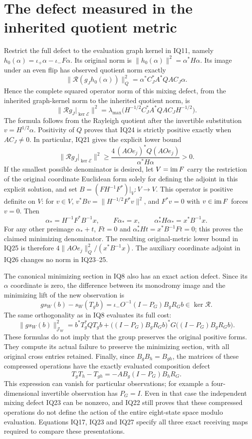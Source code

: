 \section{The defect measured in the inherited quotient metric}
Restrict the full defect to the evaluation graph kernel in IQ11, namely
$h_0(\alpha)=\iota_+\alpha-\iota_-F\alpha$.  Its original norm is
$\|h_0(\alpha)\|^2=\alpha^*H\alpha$.  Its image under an even flip
has observed quotient norm exactly
\[
 \|\mathcal R(g_Jh_0(\alpha))\|_Q^2
   =\alpha^*C_J^*A^*QA C_J\alpha.                  \tag{IQ23}
\]
Hence the complete squared operator norm of this mixing defect, from
the inherited graph-kernel norm to the inherited quotient norm, is
\[
 \|\mathcal Rg_J|_{\ker\mathcal E}\|^2
 =\lambda_{\max}
   \bigl(H^{-1/2}C_J^*A^*QA C_JH^{-1/2}\bigr).       \tag{IQ24}
\]
The formula follows from the Rayleigh quotient after the invertible
substitution $v=H^{1/2}\alpha$.  Positivity of $Q$ proves that IQ24
is strictly positive exactly when $AC_J\ne0$.  In particular, IQ21
gives the explicit lower bound
\[
 \|\mathcal Rg_J|_{\ker\mathcal E}\|^2
 \ge \frac{4\,(AOe_j)^*Q(AOe_j)}{\alpha^*H\alpha}>0. \tag{IQ25}
\]
If the smallest possible denominator is desired, let
$V=\operatorname{im} F$ carry the restriction of the original coordinate Euclidean
form solely for defining the adjoint in this explicit solution, and set
$B=(FH^{-1}F^*)|_V:V\to V$.  This operator is positive definite on
$V$: for $v\in V$, $v^*Bv=\|H^{-1/2}F^*v\|^2$, and
$F^*v=0$ with $v\in\operatorname{im} F$ forces $v=0$.  Then
\[
 \alpha_*=H^{-1}F^*B^{-1}x,\qquad
 F\alpha_*=x,\qquad
 \alpha_*^*H\alpha_*=x^*B^{-1}x.                   \tag{IQ26}
\]
For any other preimage $\alpha_*+t$, $Ft=0$ and
$\alpha_*^*Ht=x^*B^{-1}Ft=0$; this proves the claimed minimizing
denominator.  The resulting original-metric lower bound in IQ25 is
therefore $4\|AOe_j\|_Q^2/(x^*B^{-1}x)$.  The auxiliary coordinate
adjoint in IQ26 changes no norm in IQ23--25.

The canonical minimizing section in IQ8 also has an exact action defect.
Since its $\alpha$ coordinate is zero, the difference between its
monodromy image and the minimizing lift of the new observation is
\[
 g s_W(b)-s_W(T_gb)
 =\iota_-O^{-1}(I-P_G)B_gR_Gb\in\ker\mathcal R.     \tag{IQ27}
\]
The same orthogonality as in IQ8 evaluates its full cost:
\[
 \|g s_W(b)\|_{\mathcal J_W}^2
 =b^*T_g^*QT_gb+
  \bigl((I-P_G)B_gR_Gb\bigr)^*G
       \bigl((I-P_G)B_gR_Gb\bigr).                 \tag{IQ28}
\]
These formulas do not imply that the group preserves the original
positive forms.  They compute its actual failure to preserve the
minimizing section, with all original cross entries retained.
Finally, since $B_gB_h=B_{gh}$, the matrices of these compressed
operations have the exactly evaluated composition defect
\[
 T_gT_h-T_{gh}
   =-AB_g(I-P_G)B_hR_G.                            \tag{IQ29}
\]
This expression can vanish for particular observations; for example a
four-dimensional invertible observation has $P_G=I$.  Even in that
case the independent mixing defect IQ23 can be nonzero, and IQ22
still proves that these compressed operations do not define the
action of the entire eight-state space modulo evaluation.  Equations
IQ17, IQ23 and IQ27 specify all three exact receiving maps required
to compare these presentations.

